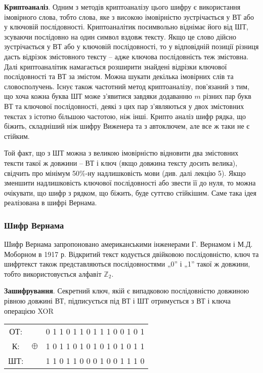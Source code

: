 \textbf{Криптоаналіз}. Одним з методів криптоаналізу цього шифру є
використання імовірного слова, тобто слова, яке з високою імовірністю
зустрічається у ВТ або у ключовій послідовності. Криптоаналітик
посимвольно віднімає його від ШТ, зсуваючи послідовно на один символ
вздовж тексту. Якщо це слово дійсно зустрічається у ВТ або у ключовій
послідовності, то у відповідній позиції різниця дасть відрізок змістовного 
тексту – адже ключова послідовність теж змістовна. Далі криптоаналітик
намагається розширити знайдені відрізки ключової послідовності та ВТ за
змістом. Можна шукати декілька імовірних слів та словосполучень. Існує
також частотний метод криптоаналізу, пов’язаний з тим, що хоча кожна
буква ШТ може з’явитися завдяки додаванню $m$ різних пар букв ВТ та
ключової послідовності, деякі з цих пар з’являються у двох змістовних
текстах з істотно більшою частотою, ніж інші. Крипто аналіз шифр рядка, що
біжить, складніший ніж шифру Виженера та з автоключем, але все ж таки не
є стійким.

Той факт, що з ШТ можна з великою імовірністю відновити два
змістовних тексти такої ж довжини – ВТ і ключ (якщо довжина тексту досить
велика), свідчить про мінімум 50\%-ну надлишковість мови (див. далі лекцію
5). Якщо зменшити надлишковість ключової послідовності або звести її до
нуля, то можна очікувати, що шифр з рядком, що біжить, буде суттєво
стійкішим. Саме така ідея реалізована в шифрі Вернама.

\subsubsection{Шифр Вернама}

Шифр Вернама запропоновано американськими інженерами Г.
Вернамом і М.Д. Моборном в 1917 р. Відкритий текст кодується двійковою
послідовністю, ключ та шифртекст також представляються послідовностями
„0” і „1” такої ж довжини, тобто використовується алфавіт $\mathbb{Z}_2$.

\textbf{Зашифрування}. Секретний ключ, якій є випадковою послідовністю
довжиною рівною довжині ВТ, підписується під ВТ і ШТ отримується з ВТ і
ключа операцією XOR
\begin{center}
    \begin{tabular}{ccc}
        ОТ: &          & 0 1 1 0 1 1 0 1 1 1 0 0 1 0 1  \\
        К:  & $\oplus$ & 1 0 1 1 0 1 0 1 0 1 0 1 0 1 1  \\
        ШТ: &          & 1 1 0 1 1 0 0 0 1 0 0 1 1 1 0  \\
    \end{tabular}
\end{center}

